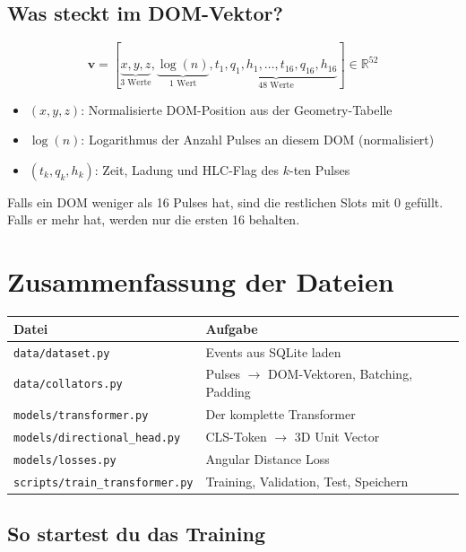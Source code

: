 \documentclass[12pt, a4paper]{article}
\begin{document}
\subsection{Was steckt im DOM-Vektor?}

\[
    \mathbf{v} = [\underbrace{x, y, z}_\text{3 Werte}, \underbrace{\log(n)}_\text{1 Wert}, \underbrace{t_1, q_1, h_1, \ldots, t_{16}, q_{16}, h_{16}}_\text{48 Werte}] \in \mathbb{R}^{52}
\]

\begin{itemize}
    \item $(x, y, z)$: Normalisierte DOM-Position aus der Geometry-Tabelle
    \item $\log(n)$: Logarithmus der Anzahl Pulses an diesem DOM (normalisiert)
    \item $(t_k, q_k, h_k)$: Zeit, Ladung und HLC-Flag des $k$-ten Pulses
\end{itemize}

Falls ein DOM weniger als 16 Pulses hat, sind die restlichen Slots mit
0 gef\"ullt. Falls er mehr hat, werden nur die ersten 16 behalten.


\newpage
\section{Zusammenfassung der Dateien}

\begin{table}[H]
\centering
\begin{tabular}{ll}
\toprule
\textbf{Datei} & \textbf{Aufgabe} \\
\midrule
\texttt{data/dataset.py} & Events aus SQLite laden \\
\texttt{data/collators.py} & Pulses $\to$ DOM-Vektoren, Batching, Padding \\
\texttt{models/transformer.py} & Der komplette Transformer \\
\texttt{models/directional\_head.py} & CLS-Token $\to$ 3D Unit Vector \\
\texttt{models/losses.py} & Angular Distance Loss \\
\texttt{scripts/train\_transformer.py} & Training, Validation, Test, Speichern \\
\bottomrule
\end{tabular}
\end{table}

\subsection{So startest du das Training}
\end{document}
